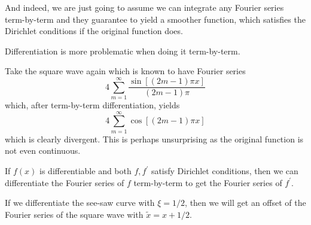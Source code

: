 \documentclass[a4paper]{article}
\begin{document}
And indeed, we are just going to assume we can integrate any Fourier series term-by-term and they guarantee to yield a smoother function, which satisfies the Dirichlet conditions if the original function does.

Differentiation is more problematic when doing it term-by-term.
\begin{example}
    Take the square wave again which is known to have Fourier series
    $$4\sum_{m=1}^\infty\frac{\sin[(2m-1)\pi x]}{(2m-1)\pi}$$
    which, after term-by-term differentiation, yields
    $$4\sum_{m=1}^\infty\cos[(2m-1)\pi x]$$
    which is clearly divergent.
    This is perhaps unsurprising as the original function is not even continuous.
\end{example}
\begin{theorem}
    If $f(x)$ is differentiable and both $f,f^\prime$ satisfy Dirichlet conditions, then we can differentiate the Fourier series of $f$ term-by-term to get the Fourier series of $f^\prime$.
\end{theorem}
\begin{example}
    If we differentiate the see-saw curve with $\xi=1/2$, then we will get an offset of the Fourier series of the square wave with $ \tilde{x}=x+1/2 $.
\end{example}
\end{document}
